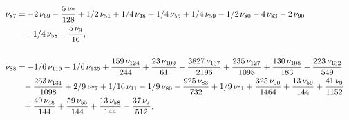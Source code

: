 \documentclass[a4paper,12pt, DIV=14, BCOR=5mm, twoside, headsepline]{scrbook}
\begin{document}
\begin{align}
\begin{aligned}
\\
\nu_{{87}}&=-2\,\nu_{{69}}-{\frac {5\,\nu_{{7}}}{128}}+1/2\,\nu_{{51}}
+1/4\,\nu_{{48}}+1/4\,\nu_{{55}}+1/4\,\nu_{{59}}-1/2\,\nu_{{80}}-4\,
\nu_{{83}}-2\,\nu_{{90}}\\
 &\hphantom{=}+1/4\,\nu_{{58}}-{\frac {5\,\nu_{{9}}}{16}},\\
\\
\nu_{{88}}&=-1/6\,\nu_{{119}}-1/6\,\nu_{{135}}+{\frac {159\,\nu_{{124}}
}{244}}+{\frac {23\,\nu_{{109}}}{61}}-{\frac {3827\,\nu_{{137}}}{2196}
}+{\frac {235\,\nu_{{127}}}{1098}}+{\frac {130\,\nu_{{108}}}{183}}-{
\frac {223\,\nu_{{132}}}{549}}\\
 &\hphantom{=}-{\frac {263\,\nu_{{131}}}{1098}}+2/9\,
\nu_{{77}}+1/16\,\nu_{{11}}-1/9\,\nu_{{80}}-{\frac {925\,\nu_{{83}}}{
732}}+1/9\,\nu_{{51}}+{\frac {325\,\nu_{{90}}}{1464}}+{\frac {13\,\nu_
{{59}}}{144}}+{\frac {41\,\nu_{{9}}}{1152}}\\
 &\hphantom{=}+{\frac {49\,\nu_{{48}}}{
144}}+{\frac {59\,\nu_{{55}}}{144}}+{\frac {13\,\nu_{{58}}}{144}}-{
\frac {37\,\nu_{{7}}}{512}}, 
\end{aligned}
\end{align}
\end{document}
